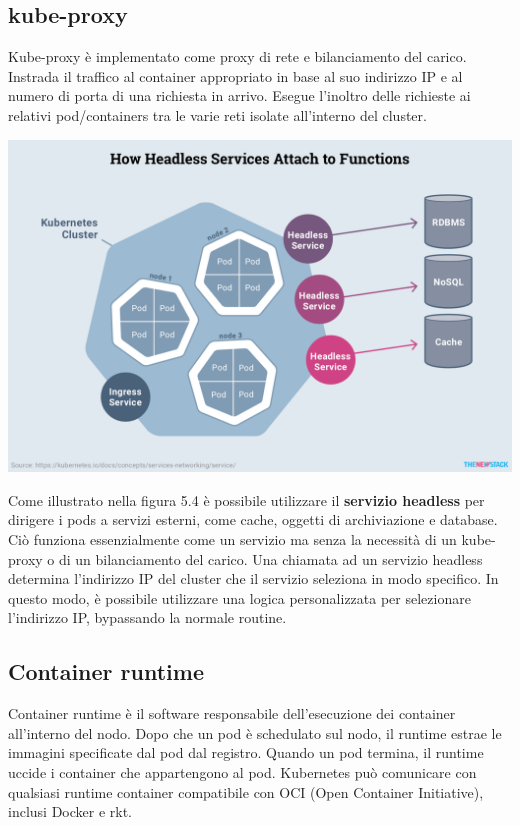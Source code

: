 \documentclass[12pt, a4paper]{report}
\begin{document}
\subsection{kube-proxy}
Kube-proxy è implementato come proxy di rete e bilanciamento del carico. Instrada il traffico al container appropriato in base al suo indirizzo IP e al numero di porta di una richiesta in arrivo. Esegue l'inoltro delle richieste ai relativi pod/containers tra le varie reti isolate all'interno del cluster.
\begin{center}
  \includegraphics[scale=0.55]{Images/Kubernetes-proxy}
\end{center}
Come illustrato nella figura 5.4 è possibile utilizzare il \textbf{servizio headless} per dirigere i pods a servizi esterni, come cache, oggetti di archiviazione e database. Ciò funziona essenzialmente come un servizio ma senza la necessità di un kube-proxy o di un bilanciamento del carico. Una chiamata ad un servizio headless determina l'indirizzo IP del cluster che il servizio seleziona in modo specifico. In questo modo, è possibile utilizzare una logica personalizzata per selezionare l'indirizzo IP, bypassando la normale routine.
\subsection{Container runtime}
Container runtime è il software responsabile dell'esecuzione dei container all'interno del nodo. Dopo che un pod è schedulato sul nodo, il runtime estrae le immagini specificate dal pod dal registro. Quando un pod  termina, il runtime uccide i container che appartengono al pod. Kubernetes può comunicare con qualsiasi runtime container compatibile con OCI (Open Container Initiative), inclusi Docker e rkt.
\end{document}

